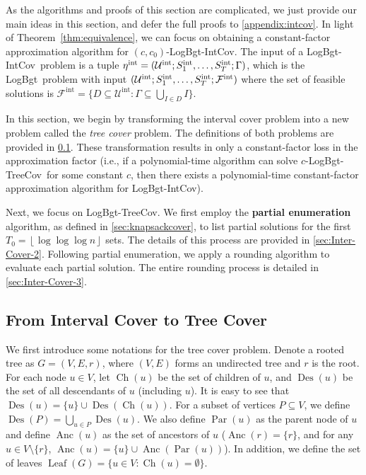 \documentclass[11pt,a4paper]{article} \usepackage{enumitem}
\newcommand{\floor}[1]{\left\lfloor #1 \right\rfloor}
\newcommand{\calF}{\mathcal{F}}
\newcommand{\calU}{\mathcal{U}}
\newcommand{\LBO}{\textsf{LogBgt}}
\newcommand{\LBOintcov}{\textsf{LogBgt-IntCov}}
\newcommand{\LBOtreecov}{\textsf{LogBgt-TreeCov}}
\newcommand{\intU}{\operatorname{\calU^{int}}}
\newcommand{\intS}[1]{\ifx\relax#1\relax
    S^{\operatorname{int}} \else
    S^{\operatorname{int}}_{#1} \fi
}
\newcommand{\intF}{\operatorname{\calF^{int}}}
\newcommand{\inteta}{\operatorname{\eta^{int}}}
\newcommand{\Des}{\operatorname{Des}}
\newcommand{\Ch}{\operatorname{Ch}}
\newcommand{\Anc}{\operatorname{Anc}}
\newcommand{\Leaf}{\operatorname{Leaf}}
\newcommand{\Par}{\operatorname{Par}}
\theoremstyle{definition}
\begin{document}
As the algorithms and proofs of this section are complicated, we just provide our main ideas in this section, and defer the full proofs to \cref{appendix:intcov}.
In light of Theorem~\ref{thm:equivalence},
we can focus on obtaining a constant-factor approximation algorithm for $(c,c_0)$-\LBOintcov. 
The input of a \LBOintcov\ problem is a tuple $\inteta=(\intU;\intS{1},\ldots,\intS{T};\Gamma)$, which is the \LBO\ problem with input $(\intU;\intS{1},\ldots,\intS{T};\intF)$
where the set of feasible solutions is $\intF=\lbrace D\subseteq \intU : \Gamma\subseteq \bigcup_{I\in D} I\rbrace$. 

In this section, we begin by transforming the interval cover problem into a new problem called the {\em tree cover} problem. The definitions of both problems are provided in \cref{sec:Inter-Cover-1}. 
These transformation results in only a constant-factor loss in the approximation factor
(i.e., if a polynomial-time algorithm can solve $c$-\LBOtreecov\ for some constant $c$, then there exists a polynomial-time constant-factor approximation algorithm for \LBOintcov).

Next, we focus on \LBOtreecov. 
We first employ the \textbf{partial enumeration} algorithm, as defined in \cref{sec:knapsackcover}, to list partial solutions for the first $T_0 = \floor{\log\log\log n}$ sets. 
The details of this process are provided in \cref{sec:Inter-Cover-2}. Following partial enumeration, we apply a rounding algorithm to evaluate each partial solution. The entire  rounding process is detailed in \cref{sec:Inter-Cover-3}.

\subsection{From Interval Cover to Tree Cover}
\label{sec:Inter-Cover-1}

We first introduce some notations for the tree cover problem. Denote a rooted tree as $G = (V, E, r)$, where $(V, E)$ forms an undirected tree and $r$ is the root. For each node $u \in V$, let $\Ch(u)$ be the set of children of $u$, and $\Des(u)$ be the set of all descendants of $u$ (including $u$). 
It is easy to see that $\Des(u) = \{u\} \cup \Des(\Ch(u))$.
For a subset of vertices
$P \subseteq V$, we define $\Des(P) = \bigcup_{u \in P} \Des(u)$. 
We also define $\Par(u)$ as the parent node of $u$ and define $\Anc(u)$ as the set of ancestors of $u$ ($\Anc(r) = \{r\}$, and for any $u \in V \setminus \{r\}$, $\Anc(u) = \{u\} \cup \Anc(\Par(u))$). In addition, we define the set of leaves $\Leaf(G) = \{u \in V : \Ch(u) = \emptyset\}$.
\end{document}

